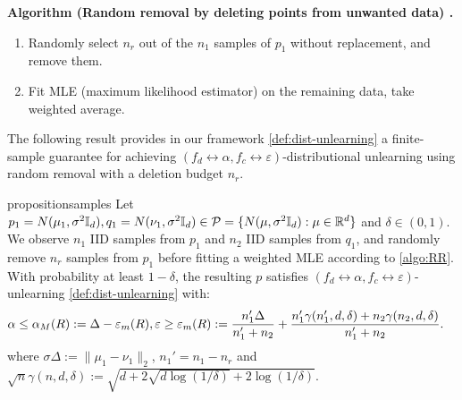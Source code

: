 \textbf{Algorithm (Random removal by deleting points from unwanted data) \citep{allouah2025distributionalmachineunlearningselective}.} 
\begin{enumerate}[nosep] \label{algo:RR}
\item Randomly select $n_r$ out of the $n_1$ samples of $p_1$ without replacement, and remove them.
\item  Fit MLE (maximum likelihood estimator) on the remaining data,  take weighted average.
\end{enumerate}

The following result provides in our framework \ref{def:dist-unlearning} a finite-sample guarantee for achieving $(f_d \leftrightarrow \alpha,f_c \leftrightarrow \varepsilon)$-distributional unlearning using random removal with a deletion budget $n_r$.


\begin{restatable}{proposition}{samples}
\label{th:random}
Let $p_1=N(\mu_1, \sigma^2 \mathbb{I}_d), q_1= N(\nu_1, \sigma^2 \mathbb{I}_d) \in \mathcal{P}= \{N(\mu, \sigma^2\mathbb{I}_d): \mu \in \mathbb{R}^d\}$ and $\delta \in (0,1)$. We observe $n_1$ IID samples from $p_1$ and $n_2$ IID samples from $q_1$, and randomly remove $n_r$ samples from $p_1$ before fitting a weighted MLE according to \ref{algo:RR}. With probability at least $1 - \delta$, the resulting $p$ satisfies $(f_d \leftrightarrow \alpha,f_c\leftrightarrow  \varepsilon)$- unlearning \ref{def:dist-unlearning} with:
\begin{align*}
\alpha & \leq \alpha_M(R):= \Delta -  \varepsilon_m(R),
\varepsilon \geq  \varepsilon_m(R):= \frac{n_1'  \Delta }{n_1' + n_2} + \frac{n_1' \gamma(n_1',d,\delta) + n_2 \gamma(n_2, d,\delta) }{n_1' + n_2}.
\end{align*}
where $\sigma \Delta := \|\mu_1- \nu_1\|_2$, $n_1'= n_1- n_r$ and $\sqrt{n} \gamma(n, d, \delta):= \sqrt{d+2\sqrt{d \log (1/\delta)} + 2 \log (1/\delta)}$.  
\end{restatable}

